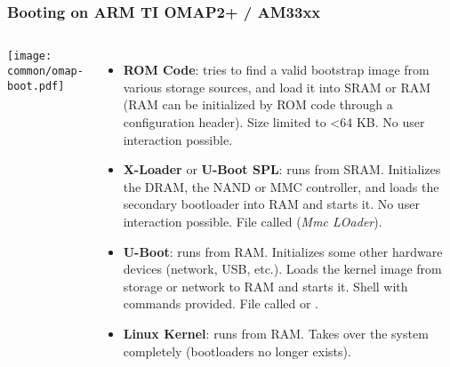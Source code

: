 \begin{frame}
\frametitle{Booting on ARM TI OMAP2+ / AM33xx}
  \begin{columns}
    \texttt{[image: common/omap-boot.pdf]}
    \footnotesize
    \begin{itemize}
    \item {\bf ROM Code}: tries to find a valid bootstrap image from
      various storage sources, and load it into SRAM or RAM (RAM can
      be initialized by ROM code through a configuration header). Size
      limited to \textless 64 KB. No user interaction possible.
    \item {\bf X-Loader} or {\bf U-Boot SPL}: runs from SRAM. Initializes
      the DRAM, the NAND or MMC controller, and loads the secondary
      bootloader into RAM and starts it. No user interaction
      possible. File called  ({\em Mmc LOader}).
    \item {\bf U-Boot}: runs from RAM. Initializes some other hardware
      devices (network, USB, etc.).  Loads the kernel image from
      storage or network to RAM and starts it. Shell with commands
      provided. File called  or .
    \item {\bf Linux Kernel}: runs from RAM. Takes over the system
      completely (bootloaders no longer exists).
    \end{itemize}
  \end{columns}
\end{frame}

